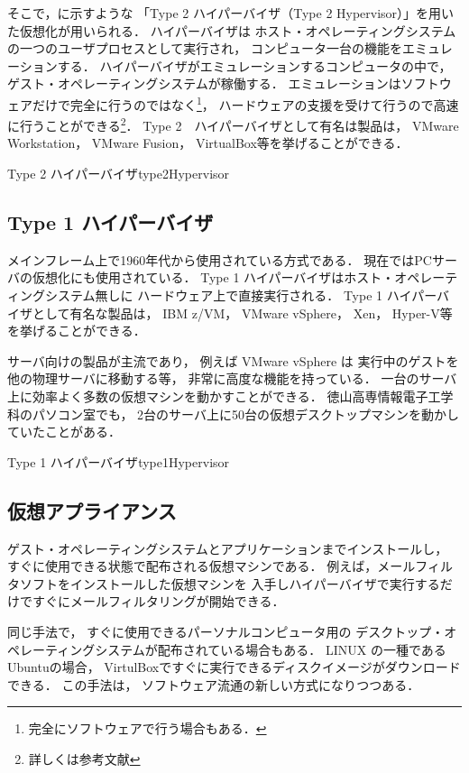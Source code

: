 そこで，に示すような
「Type 2 ハイパーバイザ（Type 2 Hypervisor）」を用いた仮想化が用いられる．
ハイパーバイザは
ホスト・オペレーティングシステムの一つのユーザプロセスとして実行され，
コンピュータ一台の機能をエミュレーションする．
ハイパーバイザがエミュレーションするコンピュータの中で，
ゲスト・オペレーティングシステムが稼働する．
エミュレーションはソフトウェアだけで完全に行うのではなく\footnote{
完全にソフトウェアで行う場合もある．}，
ハードウェアの支援を受けて行うので高速に行うことができる\footnote{
詳しくは参考文献\cite{virtualization}}．
Type 2　ハイパーバイザとして有名は製品は，
VMware Workstation，
VMware Fusion，
VirtualBox等を挙げることができる．

{Type 2 ハイパーバイザ}{type2Hypervisor}

\subsection{Type 1 ハイパーバイザ}
メインフレーム上で1960年代から使用されている方式である．
現在ではPCサーバの仮想化にも使用されている．
Type 1 ハイパーバイザはホスト・オペレーティングシステム無しに
ハードウェア上で直接実行される．
Type 1 ハイパーバイザとして有名な製品は，
IBM z/VM，
VMware vSphere，
Xen，
Hyper-V等を挙げることができる．

サーバ向けの製品が主流であり，
例えば VMware vSphere は
実行中のゲストを他の物理サーバに移動する等，
非常に高度な機能を持っている\cite{vsphere}．
一台のサーバ上に効率よく多数の仮想マシンを動かすことができる．
徳山高専情報電子工学科のパソコン室でも，
2台のサーバ上に50台の仮想デスクトップマシンを動かしていたことがある．

{Type 1 ハイパーバイザ}{type1Hypervisor}

\subsection{仮想アプライアンス}
ゲスト・オペレーティングシステムとアプリケーションまでインストールし，
すぐに使用できる状態で配布される仮想マシンである．
例えば，メールフィルタソフトをインストールした仮想マシンを
入手しハイパーバイザで実行するだけですぐにメールフィルタリングが開始できる．

同じ手法で，
すぐに使用できるパーソナルコンピュータ用の
デスクトップ・オペレーティングシステムが配布されている場合もある．
LINUX の一種であるUbuntuの場合，
VirtulBoxですぐに実行できるディスクイメージがダウンロードできる\cite{ubuntu}．
この手法は，
ソフトウェア流通の新しい方式になりつつある．
